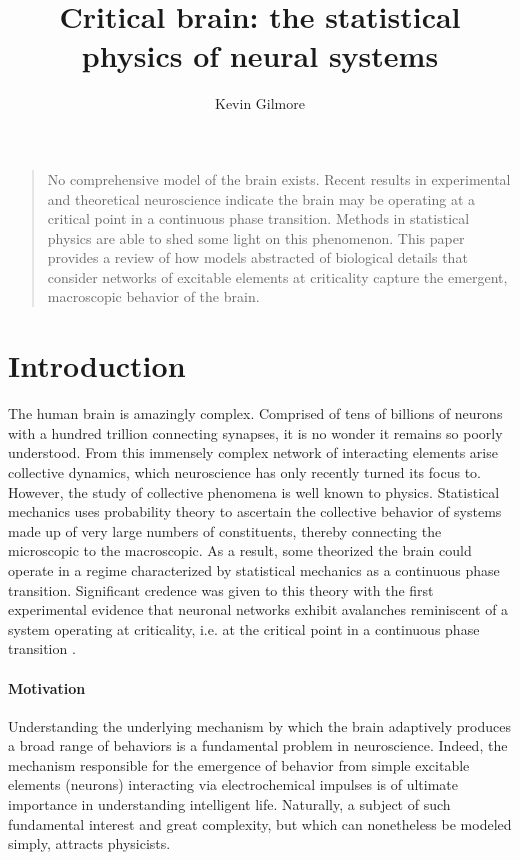 \documentclass[12pt]{article}
\title{Critical brain: the statistical physics of neural systems}
\author
{Kevin Gilmore}
\newenvironment{sciabstract}{%
\begin{quote} \bf}
{\end{quote}}
\begin{document}
 


\baselineskip24pt


\maketitle 


\begin{sciabstract}

No comprehensive model of the brain exists. Recent results in experimental and theoretical neuroscience indicate the brain may be operating at a critical point in a continuous phase transition. Methods in statistical physics are able to shed some light on this phenomenon. This paper provides a review of how models abstracted of biological details that consider networks of excitable elements at criticality capture the emergent, macroscopic behavior of the brain.

\end{sciabstract}

\section*{Introduction}

The human brain is amazingly complex. Comprised of tens of billions of neurons with a hundred trillion connecting synapses, it is no wonder it remains so poorly understood. From this immensely complex network of interacting elements arise collective dynamics, which neuroscience has only recently turned its focus to. However, the study of collective phenomena is well known to physics. Statistical mechanics uses probability theory to ascertain the collective behavior of systems made up of very large numbers of constituents, thereby connecting the microscopic to the macroscopic. As a result, some theorized the brain could operate in a regime characterized by statistical mechanics as a continuous phase transition\cite{Bak1987a}. Significant credence was given to this theory with the first experimental evidence that neuronal networks exhibit avalanches reminiscent of a system operating at criticality, i.e. at the critical point in a continuous phase transition \cite{Beggs2003b}.

\paragraph*{Motivation} Understanding the underlying mechanism by which the brain adaptively produces a broad range of behaviors is a fundamental problem in neuroscience. Indeed, the mechanism responsible for the emergence of behavior from simple excitable elements (neurons) interacting via electrochemical impulses is of ultimate importance in understanding intelligent life. Naturally, a subject of such fundamental interest and great complexity, but which can nonetheless be modeled simply, attracts physicists. 
\end{document}
